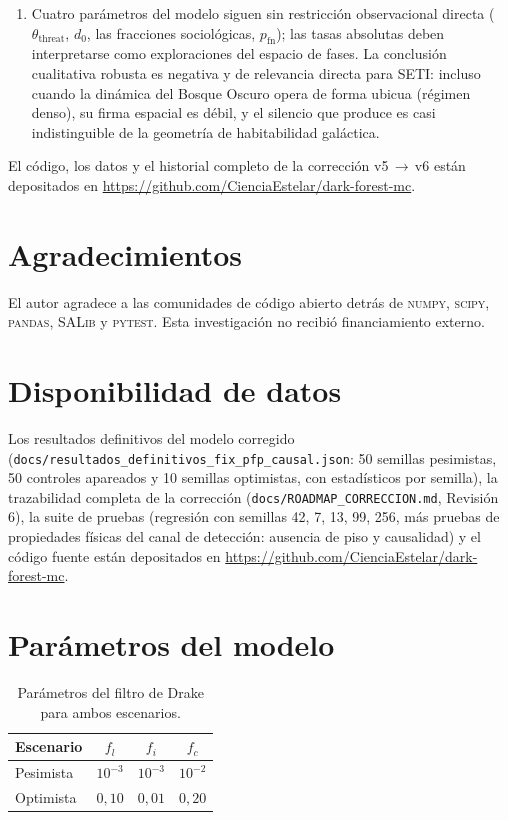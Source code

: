 \documentclass[useAMS,usenatbib,onecolumn]{mn2e}
\begin{document}
\begin{enumerate}
  \item Cuatro parámetros del modelo siguen sin restricción
        observacional directa ($\theta_\text{threat}$, $d_0$, las
        fracciones sociológicas, $p_\text{fn}$); las tasas absolutas
        deben interpretarse como exploraciones del espacio de fases.
        La conclusión cualitativa robusta es negativa y de relevancia
        directa para SETI: incluso cuando la dinámica del Bosque Oscuro
        opera de forma ubicua (régimen denso), su firma espacial es
        débil, y el silencio que produce es casi indistinguible de la
        geometría de habitabilidad galáctica.
\end{enumerate}

El código, los datos y el historial completo de la corrección
v5\,$\to$\,v6 están depositados en
\url{https://github.com/CienciaEstelar/dark-forest-mc}.

\section*{Agradecimientos}

El autor agradece a las comunidades de código abierto detrás de
\textsc{numpy}, \textsc{scipy}, \textsc{pandas}, \textsc{SALib}
y \textsc{pytest}.
Esta investigación no recibió financiamiento externo.

\section*{Disponibilidad de datos}

Los resultados definitivos del modelo corregido
(\texttt{docs/resultados\_definitivos\_fix\_pfp\_causal.json}: 50
semillas pesimistas, 50 controles apareados y 10 semillas optimistas,
con estadísticos por semilla), la trazabilidad completa de la
corrección (\texttt{docs/ROADMAP\_CORRECCION.md}, Revisión 6), la
suite de pruebas (regresión con semillas 42, 7, 13, 99, 256, más
pruebas de propiedades físicas del canal de detección:
ausencia de piso y causalidad) y el código fuente están depositados en
\url{https://github.com/CienciaEstelar/dark-forest-mc}.

\appendix
\section{Parámetros del modelo}
\label{app:params}

\begin{table}
  \centering
  \caption{Parámetros del filtro de Drake para ambos escenarios.}
  \label{tab:scenarios}
  \begin{tabular}{lccc}
    \toprule
    Escenario & $f_l$ & $f_i$ & $f_c$ \\
    \midrule
    Pesimista & $10^{-3}$ & $10^{-3}$ & $10^{-2}$ \\
    Optimista  & $0{,}10$    & $0{,}01$    & $0{,}20$    \\
    \bottomrule
  \end{tabular}
\end{table}
\end{document}
